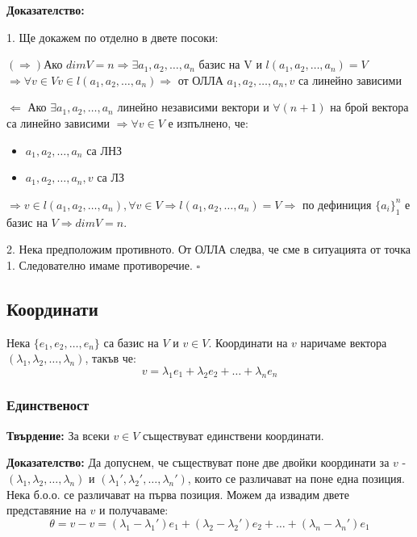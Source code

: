 \documentclass[fleqn,12pt]{article}
\begin{document}
\begin{flushleft}
\vspace{5mm}

\textbf{Доказателство:}

1. Ще докажем по отделно в двете посоки:
    
\vspace{5mm}

$(\Rightarrow) $Ако $dimV = n \Rightarrow \exists a_1, a_2, \dots, a_n $ базис на V и $l(a_1, a_2, \dots, a_n) = V$ $\Rightarrow \forall v \in V v \in l(a_1, a_2, \dots, a_n) \Rightarrow $ от ОЛЛА $ a_1, a_2, \dots, a_n, v $ са линейно зависими 

\vspace{5mm}

$\Leftarrow $ Ако $ \exists a_1, a_2, \dots, a_n $ линейно независими вектори и $ \forall (n + 1) $ на брой вектора са линейно зависими $\Rightarrow \forall v \in V $ е изпълнено, че:
\begin{itemize}
    \item $a_1, a_2, \dots, a_n $ са ЛНЗ
    \item $a_1, a_2, \dots, a_n, v $ са  ЛЗ
\end{itemize}
    
$\Rightarrow v \in l(a_1, a_2, \dots, a_n), \forall v \in V \Rightarrow l(a_1, a_2, \dots, a_n) = V \Rightarrow $ по дефиниция $ \{a_i\}_1^n $ е базис на $V \Rightarrow dimV = n$. 

\vspace{5mm}

2. Нека предположим противното. От ОЛЛА следва, че сме в ситуацията от точка 1. Следователно имаме противоречие. $\square$

\subsection{Координати}
Нека $\{e_1, e_2, \dots, e_n\}$ са базис на $V$ и $v \in V$. Координати на $v$ наричаме вектора $(\lambda_1, \lambda_2, \dots, \lambda_n)$, такъв че:
\[ v = \lambda_1 e_1 + \lambda_2 e_2 + \dots + \lambda_n e_n \]

\subsubsection{Единственост}
\textbf{Твърдение: } За всеки $v \in V$ съществуват единствени координати.

\vspace{5mm}
\textbf{Доказателство: } Да допуснем, че съществуват поне две двойки координати за $v$ - $(\lambda_1, \lambda_2, \dots, \lambda_n)$ и 
$(\lambda_1', \lambda_2', \dots, \lambda_n')$, които се различават на поне една позиция. Нека б.о.о. се различават на първа позиция. 
Можем да извадим двете представяние на $v$ и получаваме:
\[ \theta = v - v = (\lambda_1 - \lambda_1') e_1 + (\lambda_2 - \lambda_2') e_2 + \dots + (\lambda_n - \lambda_n') e_1\]


\end{flushleft}
\end{document}
